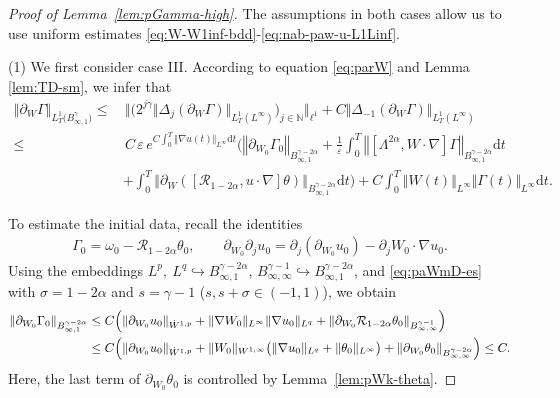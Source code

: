\documentclass[reqno,11pt,a4paper]{amsart}
\newcommand{\dd}{\mathrm{d}}
\begin{document}
\begin{proof}[Proof of Lemma~\ref{lem:pGamma-high}]
The assumptions in both cases allow us to use
uniform estimates
\eqref{eq:W-W1inf-bdd}-\eqref{eq:nab-paw-u-L1Linf}.

\medskip
\noindent
(1) We first consider case III. 
According to equation \eqref{eq:parW} and Lemma \ref{lem:TD-sm}, 
we infer that
\begin{equation}\label{eq:paw-Gam-L1Bes1}
\begin{split}
  \left\Vert \partial_W \Gamma\right\Vert _{L_T^1\big( B_{\infty, 1}^{\gamma}\big)}
  \leq  & \, \big\Vert  \big( 2^{j\gamma} \Vert \Delta_j (\partial_W \Gamma)\Vert _{L^1_T(L^\infty)}
  \big)_{j\in\mathbb{N}} \big\Vert _{\ell^1} +
  C \Vert \Delta_{-1} (\partial_W \Gamma)\Vert _{L^1_T(L^\infty)}  \\
  \leq & \,C\, \varepsilon\, e^{C\int_0^T\Vert \nabla u(t)\Vert _{L^\infty}\dd t}
  \bigg(\left\Vert \partial_{W_0} \Gamma_0\right\Vert _{B_{\infty, 1}^{\gamma-2\alpha}}
  + \frac{1}{\varepsilon} \int_0^T\left\Vert \left[\Lambda^{2\alpha}, W \cdot \nabla\right] 
  \Gamma\right\Vert _{ B_{\infty, 1}^{\gamma-2\alpha}}\dd t  \\
  & +\int_0^T\left\Vert \partial_W\left(\left[\mathcal{R}_{1-2\alpha}, u \cdot \nabla\right] 
  \theta\right)\right\Vert _{B_{\infty, 1}^{\gamma-2\alpha}}
  \dd t\bigg) + C\int_0^T\Vert W(t)\Vert _{L^\infty}\Vert \Gamma(t)\Vert _{L^\infty}\dd t.
\end{split}
\end{equation}

To estimate the initial data, recall the identities
\begin{equation}\label{eq:idd-rela1}
\begin{aligned}
  \Gamma_0
  =\omega_0-\mathcal R_{1-2\alpha}\theta_0,\qquad
  \partial_{W_0}\partial_j u_0
  =\partial_j(\partial_{W_0}u_0)
    -\partial_jW_0\cdot\nabla u_0.
\end{aligned}
\end{equation}
Using the embeddings
$L^p,\ L^q\hookrightarrow  B^{\gamma-2\alpha}_{\infty,1}$,
$B^{\gamma-1}_{\infty,\infty}\hookrightarrow B^{\gamma-2\alpha}_{\infty,1}$,
and \eqref{eq:paWmD-es} with
$\sigma=1-2\alpha$ and $s=\gamma-1$ ($s,s+\sigma\in(-1,1)$), we obtain
\begin{align*}
  \Vert \partial_{W_0}\Gamma_0
    \Vert _{B^{\gamma-2\alpha}_{\infty,1}}
  &\leq C\Bigl(
    \Vert \partial_{W_0}u_0\Vert _{\dot W^{1,p}}
    +\Vert \nabla W_0\Vert _{L^\infty}\Vert \nabla u_0\Vert _{L^q}
  + \Vert \partial_{W_0}\mathcal R_{1-2\alpha}\theta_0
      \Vert _{B^{\gamma-1}_{\infty,\infty}}
  \Bigr)
  \\
  &\leq C\Bigl(
    \Vert \partial_{W_0}u_0\Vert _{\dot W^{1,p}}
    +\Vert W_0\Vert _{W^{1,\infty}}
      \bigl(\Vert \nabla u_0\Vert _{L^q}
            +\Vert \theta_0\Vert _{L^\infty}\bigr)
      +  \Vert \partial_{W_0}\theta_0
      \Vert _{B^{\gamma-2\alpha}_{\infty,\infty}}
  \Bigr)
  \leq C.
\end{align*}
Here, the last term of $\partial_{W_0} \theta_0$
is controlled by Lemma~\ref{lem:pWk-theta}.


\end{proof}
\end{document}
